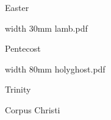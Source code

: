 \bigskip

\eject

\beginpart Easter


\bigskip


\eject


\bigskip


\eject


\bigskip



\bigskip

\saveimageresource width 30mm {lamb.pdf}

\centerline{\useimageresource \lastsavedimageresourceindex}



\bigskip

\eject


\paginaproxima

\beginpart Pentecost


\bigskip

\saveimageresource width 80mm {holyghost.pdf}

\centerline{\useimageresource \lastsavedimageresourceindex}



\bigskip

\eject


\paginaproxima

\beginpart Trinity



\paginaproxima

\beginpart Corpus Christi


\bigskip

